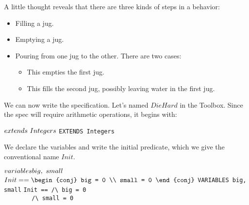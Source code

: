 \begin{en}
A little thought reveals that there are three kinds of steps in a
behavior:
\begin{itemize}
\item Filling a jug.
\item Emptying a jug.
\item Pouring from one jug to the other.  There are two cases:
\begin{itemize}
\item This empties the first jug.
\item This fills the second jug, possibly leaving water
      in the first jug.
\end{itemize}
\end{itemize}
We can now write the specification.  Let's  named $DieHard$ in the Toolbox.  Since the spec
will require arithmetic operations, it begins with:
\begin{display}
\begin{twocols}%
$\EXTENDS\ Integers$
\midcol
\verb|EXTENDS Integers|
\end{twocols}
\end{display}
We declare the variables and write the initial predicate, which we
give the conventional name $Init$.
\smallskip
\begin{display}
\begin{twocols}%
$\VARIABLES big,\ small$ 
$Init == 
\begin{conj}
big = 0 \\ small = 0
\end{conj}
$
\midcol
\verb*|VARIABLES big, small|
\verb*|Init == /\ big = 0| \\
\verb*|        /\ small = 0|
\end{twocols}
\end{display}
\smallskip
\end{en}
